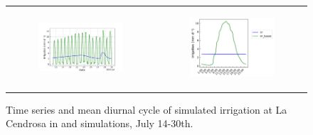 \begin{figure}[hbtp]
    \centering
    \begin{tabular}{cc}
        \begin{subfigure}[t]{0.5\textwidth}
            \caption{}
            \includegraphics[width=\textwidth]{images/chap5/SOP_TS_DC/time_series_cendrosa_irrigation.png}
        \end{subfigure} &
        \begin{subfigure}[t]{0.5\textwidth}
            \caption{}
            \includegraphics[width=\textwidth]{images/chap5/SOP_TS_DC/diurnal_cycle_cendrosa_irrigation.png}
        \end{subfigure}
    \end{tabular} 
    \caption{Time series and mean diurnal cycle  of simulated irrigation at La Cendrosa in \irr and \irrboost simulations, July 14-30th.}
    \label{fig:sop_irrigation_orchidee}
\end{figure}

